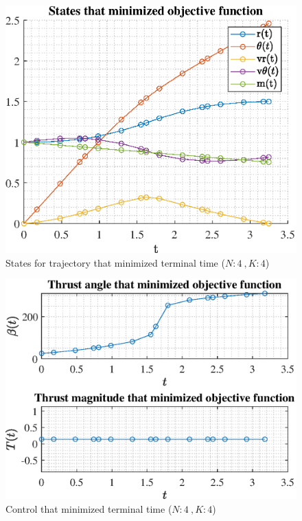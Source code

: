 \documentclass[]{article}
\begin{document}
\begin{figure}
	\centering
	\includegraphics[scale=0.75]{states_N4_K4_C3_tf.eps}
	\caption{States for trajectory that minimized terminal time (\(N:4\ , K:4\))}
	\label{fig:states_N4_K4_C3_tf}
\end{figure}
\begin{figure}
	\centering
	\includegraphics[scale=0.75]{control_N4_K4_C3_tf.eps}
	\caption{Control that minimized terminal time (\(N:4\ , K:4\))}
	\label{fig:control_N4_K4_C3_tf}
\end{figure}
\end{document}
